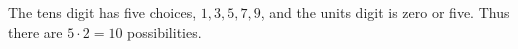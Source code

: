 The tens digit has five choices, $1,3,5,7,9$, and the units digit is zero or five. Thus there are $5\cdot2=\boxed{10}$ possibilities.
